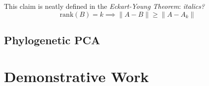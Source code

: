 \documentclass[12pt]{article}
\theoremstyle{definition}
\begin{document}
This claim is neatly defined in the \textit{Eckart-Young Theorem}: 
\textit{italics?}
\begin{equation}
	\mathrm{rank}(B) = k \implies \|A - B\| \ge \|A - A_k\|
	\label{eq:Eckart-Young}
\end{equation}

\subsection{Phylogenetic PCA}




\section{Demonstrative Work}




\printbibliography
\end{document}
